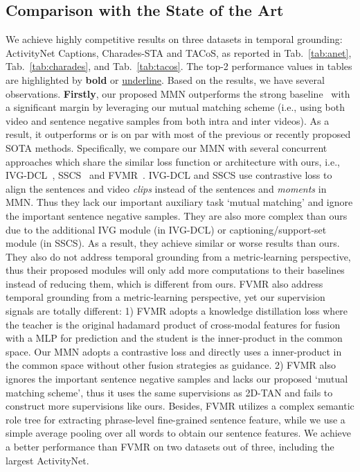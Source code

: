 \documentclass[letterpaper]{article} \usepackage{aaai22}  \usepackage{times}  \usepackage{helvet}  \usepackage{courier}  \usepackage[hyphens]{url}  \usepackage{graphicx} \urlstyle{rm} \def\UrlFont{\rm}  \usepackage{natbib}  \usepackage{caption} \DeclareCaptionStyle{ruled}{labelfont=normalfont,labelsep=colon,strut=off} \frenchspacing  \setlength{\pdfpagewidth}{8.5in}  \setlength{\pdfpageheight}{11in}  \usepackage{algorithm}
\begin{document}
\subsection{Comparison with the State of the Art} 
We achieve highly competitive results on three datasets in temporal grounding: ActivityNet Captions, Charades-STA and TACoS, as reported in Tab.~\ref{tab:anet}, Tab.~\ref{tab:charades}, and Tab.~\ref{tab:tacos}. The top-2 performance values in tables are highlighted by {\bf bold} or \underline{ underline}. Based on the results, we have several observations. {\bf Firstly}, our proposed MMN outperforms the strong baseline~\cite{DBLP:conf/aaai/ZhangPFL20} with a significant margin by leveraging our mutual matching scheme (i.e., using both video and sentence negative samples from both intra and inter videos). As a result, it outperforms or is on par with most of the previous or recently proposed SOTA methods. Specifically, we compare our MMN with several concurrent approaches which share the similar loss function or architecture with ours, i.e., IVG-DCL~\cite{DBLP:conf/cvpr/NanQXLLZL21},  SSCS~\cite{Ding_2021_ICCV} and FVMR~\cite{Gao_2021_ICCV}. IVG-DCL and SSCS use contrastive loss to align the sentences and video {\em clips} instead of the sentences and {\em moments} in MMN. Thus they lack our important auxiliary task `mutual matching' and ignore the important sentence negative samples. They are also more complex than ours due to the additional IVG module (in IVG-DCL) or captioning/support-set module (in SSCS). As a result, they achieve similar or worse results than ours. They also do not address temporal grounding from a metric-learning perspective, thus their proposed modules will only add more computations to their baselines instead of reducing them, which is different from ours. FVMR also address temporal grounding from a metric-learning perspective, yet our supervision signals are totally different: 1) FVMR adopts a knowledge distillation loss where the teacher is the original hadamard product of cross-modal features for fusion with a MLP for prediction and the student is the inner-product in the common space. Our MMN adopts a contrastive loss and directly uses a inner-product in the common space without other fusion strategies as guidance. 2) FVMR also ignores the important sentence negative samples and lacks our proposed `mutual matching scheme', thus it uses the same supervisions as 2D-TAN and fails to construct more supervisions like ours. Besides, FVMR utilizes a complex semantic role tree for extracting phrase-level fine-grained sentence feature, while we use a simple average pooling over all words to obtain our sentence features. We achieve a better performance than FVMR on two datasets out of three, including the largest ActivityNet. 
\end{document}
